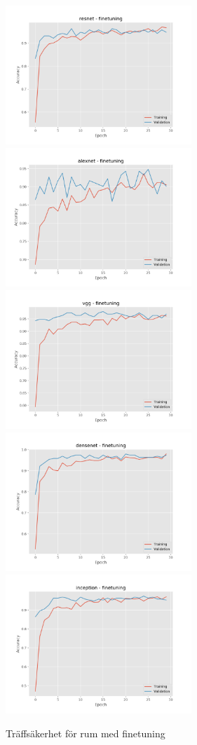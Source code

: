 \documentclass[]{kththesis}
\begin{document}
\begin{figure}[h]
  \includegraphics[width=7cm]{r_a_resnet_fine}
  \includegraphics[width=7cm]{r_a_alexnet_fine}
  \includegraphics[width=7cm]{r_a_vgg_fine}
  \includegraphics[width=7cm]{r_a_densenet_fine}
  \includegraphics[width=7cm]{r_a_inception_fine}
  \caption{Träffsäkerhet för rum med finetuning}
  \label{fig:r_a_2}
\end{figure}
\end{document}
